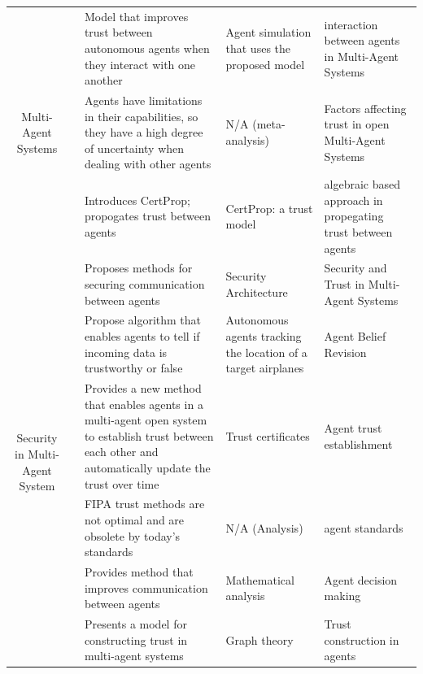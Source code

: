 \documentclass[runningheads,a4paper]{llncs}
\begin{document}
\begin{center}
\begin{longtable}{|c|c|p{4cm}|p{2cm}|p{2cm}|}
	\multirow{3}{*}{Multi-Agent Systems }
	& \cite{hang2008adaptive}     
	& Model that improves trust between autonomous agents when they interact with one another                       
	& Agent simulation that uses the proposed model                          
	& interaction between agents in Multi-Agent Systems 
	\\ \cline{2-5}
	& \cite{ramchurn2004trust}
	& Agents have limitations in their capabilities, so they have a high degree of uncertainty when dealing with other agents                     
	& N/A (meta-analysis)                      
	& Factors affecting trust in open Multi-Agent Systems    
	\\ \cline{2-5} 
	& \cite{hang2009operators}
	& Introduces CertProp; propogates trust between agents                      
	& CertProp: a trust model                 
	& algebraic based approach in propegating trust between agents
	\\ \hline
	\multirow{6}{*}{Security in Multi-Agent System}
	& \cite{wong2000adding} 
	& Proposes methods for securing communication between agents                
	& Security Architecture               
	& Security and Trust in Multi-Agent Systems      
	\\ \cline{2-5} 
	& \cite{barber2001belief}
	& Propose algorithm that enables agents to tell if incoming data is trustworthy or false          
	& Autonomous agents tracking the location of a target airplanes
	& Agent Belief Revision              
	\\ \cline{2-5}
	& \cite{mass2001distributed}
	& Provides a new method that enables agents in a multi-agent open system to establish trust between each other and automatically update the trust over time           
	& Trust certificates                          
	& Agent trust establishment           
	\\ \cline{2-5} 
	& \cite{poslad2000towards}
	& FIPA trust methods are not optimal and are obsolete by today's standards                         
	& N/A (Analysis)              
	& agent standards
	\\ \cline{2-5}
	& \cite{gmytrasiewicz1993toward}  
	& Provides method that improves communication between agents                        
	& Mathematical analysis          
	& Agent decision making
	\\ \cline{2-5} 
	& \cite{jiang2005autonomous}
	& Presents a model for constructing trust in multi-agent systems                         
	& Graph theory                     
	& Trust construction in agents                     
	\\ \hline
	

\end{longtable}
\end{center}
\end{document}
